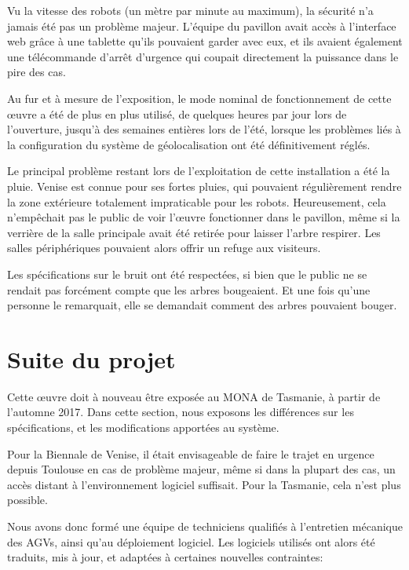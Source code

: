 \documentclass[french,A4paper,]{book}
\begin{document}
Vu la vitesse des robots (un mètre par minute au maximum), la sécurité
n'a jamais été pas un problème majeur. L'équipe du pavillon avait accès
à l'interface web grâce à une tablette qu'ils pouvaient garder avec eux,
et ils avaient également une télécommande d'arrêt d'urgence qui coupait
directement la puissance dans le pire des cas.

Au fur et à mesure de l'exposition, le mode nominal de fonctionnement de
cette œuvre a été de plus en plus utilisé, de quelques heures par jour
lors de l'ouverture, jusqu'à des semaines entières lors de l'été,
lorsque les problèmes liés à la configuration du système de
géolocalisation ont été définitivement réglés.

Le principal problème restant lors de l'exploitation de cette
installation a été la pluie. Venise est connue pour ses fortes pluies,
qui pouvaient régulièrement rendre la zone extérieure totalement
impraticable pour les robots. Heureusement, cela n'empêchait pas le
public de voir l'œuvre fonctionner dans le pavillon, même si la verrière
de la salle principale avait été retirée pour laisser l'arbre respirer.
Les salles périphériques pouvaient alors offrir un refuge aux visiteurs.

Les spécifications sur le bruit ont été respectées, si bien que le
public ne se rendait pas forcément compte que les arbres bougeaient. Et
une fois qu'une personne le remarquait, elle se demandait comment des
arbres pouvaient bouger.

\section{Suite du projet}\label{suite-du-projet}

Cette œuvre doit à nouveau être exposée au MONA de Tasmanie, à partir de
l'automne 2017. Dans cette section, nous exposons les différences sur
les spécifications, et les modifications apportées au système.

Pour la Biennale de Venise, il était envisageable de faire le trajet en
urgence depuis Toulouse en cas de problème majeur, même si dans la
plupart des cas, un accès distant à l'environnement logiciel suffisait.
Pour la Tasmanie, cela n'est plus possible.

Nous avons donc formé une équipe de techniciens qualifiés à l'entretien
mécanique des AGVs, ainsi qu'au déploiement logiciel. Les logiciels
utilisés ont alors été traduits, mis à jour, et adaptées à certaines
nouvelles contraintes:
\end{document}
